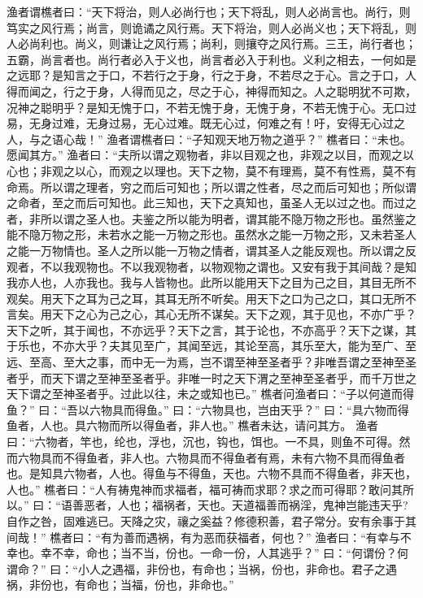 \documentclass[12pt,UTF8]{ctexbook}
\begin{document}
渔者谓樵者曰：“天下将治，则人必尚行也；天下将乱，则人必尚言也。尚行，则笃实之风行焉；尚言，则诡谲之风行焉。天下将治，则人必尚义也；天下将乱，则人必尚利也。尚义，则谦让之风行焉；尚利，则攘夺之风行焉。三王，尚行者也；五霸，尚言者也。尚行者必入于义也，尚言者必入于利也。义利之相去，一何如是之远耶？是知言之于口，不若行之于身，行之于身，不若尽之于心。言之于口，人得而闻之，行之于身，人得而见之，尽之于心，神得而知之。人之聪明犹不可欺，况神之聪明乎？是知无愧于口，不若无愧于身，无愧于身，不若无愧于心。无口过易，无身过难，无身过易，无心过难。既无心过，何难之有！吁，安得无心过之人，与之语心哉！”
渔者谓樵者曰：“子知观天地万物之道乎？”
樵者曰：“未也。愿闻其方。”
渔者曰：“夫所以谓之观物者，非以目观之也，非观之以目，而观之以心也；非观之以心，而观之以理也。天下之物，莫不有理焉，莫不有性焉，莫不有命焉。所以谓之理者，穷之而后可知也；所以谓之性者，尽之而后可知也；所似谓之命者，至之而后可知也。此三知也，天下之真知也，虽圣人无以过之也。而过之者，非所以谓之圣人也。夫鉴之所以能为明者，谓其能不隐万物之形也。虽然鉴之能不隐万物之形，未若水之能一万物之形也。虽然水之能一万物之形，又未若圣人之能一万物情也。圣人之所以能一万物之情者，谓其圣人之能反观也。所以谓之反观者，不以我观物也。不以我观物者，以物观物之谓也。又安有我于其间哉？是知我亦人也，人亦我也。我与人皆物也。此所以能用天下之目为己之目，其目无所不观矣。用天下之耳为己之耳，其耳无所不听矣。用天下之口为己之口，其口无所不言矣。用天下之心为己之心，其心无所不谋矣。天下之观，其于见也，不亦广乎？天下之听，其于闻也，不亦远乎？天下之言，其于论也，不亦高乎？天下之谋，其于乐也，不亦大乎？夫其见至广，其闻至远，其论至高，其乐至大，能为至广、至远、至高、至大之事，而中无一为焉，岂不谓至神至圣者乎？非唯吾谓之至神至圣者乎，而天下谓之至神至圣者乎。非唯一时之天下渭之至神至圣者乎，而千万世之天下谓之至神圣者乎。过此以往，未之或知也已。”
樵者问渔者曰：“子以何道而得鱼？”
曰：“吾以六物具而得鱼。”
曰：“六物具也，岂由天乎？”
曰：“具六物而得鱼者，人也。具六物而所以得鱼者，非人也。”
樵者未达，请问其方。
渔者曰：“六物者，竿也，纶也，浮也，沉也，钩也，饵也。一不具，则鱼不可得。然而六物具而不得鱼者，非人也。六物具而不得鱼者有焉，未有六物不具而得鱼者也。是知具六物者，人也。得鱼与不得鱼，天也。六物不具而不得鱼者，非天也，人也。”
樵者曰：“人有祷鬼神而求福者，福可祷而求耶？求之而可得耶？敢问其所以。”
曰：“语善恶者，人也；福祸者，天也。天道福善而祸淫，鬼神岂能违天乎?自作之咎，固难逃已。天降之灾，禳之奚益？修德积善，君子常分。安有余事于其间哉！”
樵者曰：“有为善而遇祸，有为恶而获福者，何也？”
渔者曰：“有幸与不幸也。幸不幸，命也；当不当，份也。一命一份，人其逃乎？”
曰：“何谓份？何谓命？”
曰：“小人之遇福，非份也，有命也；当祸，份也，非命也。君子之遇祸，非份也，有命也；当福，份也，非命也。”
\end{document}
